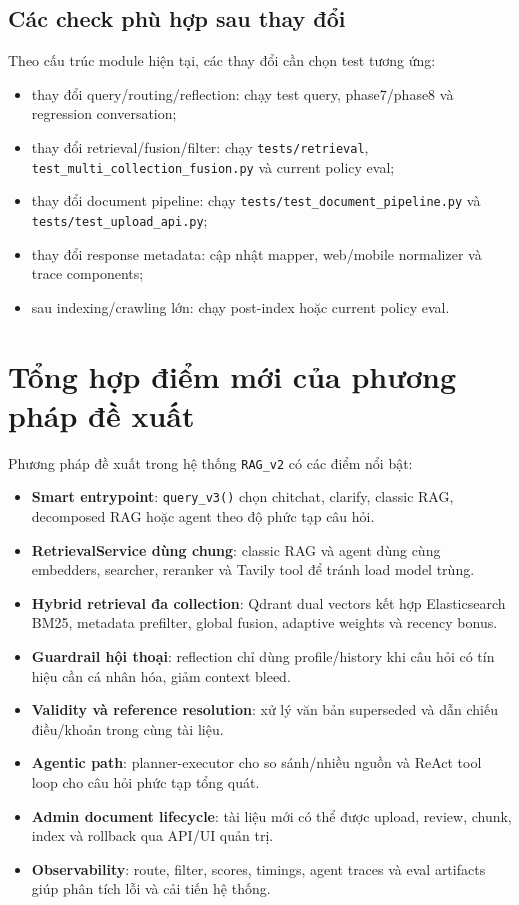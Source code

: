 \documentclass[../DoAn.tex]{subfiles}
\begin{document}
\subsection{Các check phù hợp sau thay đổi}

Theo cấu trúc module hiện tại, các thay đổi cần chọn test tương ứng:

\begin{itemize}
    \item thay đổi query/routing/reflection: chạy test query, phase7/phase8 và
    regression conversation;
    \item thay đổi retrieval/fusion/filter: chạy \texttt{tests/retrieval},
    \texttt{test\_multi\_collection\_fusion.py} và current policy eval;
    \item thay đổi document pipeline: chạy \texttt{tests/test\_document\_pipeline.py}
    và \texttt{tests/test\_upload\_api.py};
    \item thay đổi response metadata: cập nhật mapper, web/mobile normalizer và
    trace components;
    \item sau indexing/crawling lớn: chạy post-index hoặc current policy eval.
\end{itemize}

\section{Tổng hợp điểm mới của phương pháp đề xuất}

Phương pháp đề xuất trong hệ thống \texttt{RAG\_v2} có các điểm nổi bật:

\begin{itemize}
    \item \textbf{Smart entrypoint}: \texttt{query\_v3()} chọn chitchat, clarify,
    classic RAG, decomposed RAG hoặc agent theo độ phức tạp câu hỏi.
    \item \textbf{RetrievalService dùng chung}: classic RAG và agent dùng cùng
    embedders, searcher, reranker và Tavily tool để tránh load model trùng.
    \item \textbf{Hybrid retrieval đa collection}: Qdrant dual vectors kết hợp
    Elasticsearch BM25, metadata prefilter, global fusion, adaptive weights và
    recency bonus.
    \item \textbf{Guardrail hội thoại}: reflection chỉ dùng profile/history khi
    câu hỏi có tín hiệu cần cá nhân hóa, giảm context bleed.
    \item \textbf{Validity và reference resolution}: xử lý văn bản superseded và
    dẫn chiếu điều/khoản trong cùng tài liệu.
    \item \textbf{Agentic path}: planner-executor cho so sánh/nhiều nguồn và
    ReAct tool loop cho câu hỏi phức tạp tổng quát.
    \item \textbf{Admin document lifecycle}: tài liệu mới có thể được upload,
    review, chunk, index và rollback qua API/UI quản trị.
    \item \textbf{Observability}: route, filter, scores, timings, agent traces và
    eval artifacts giúp phân tích lỗi và cải tiến hệ thống.
\end{itemize}
\end{document}
